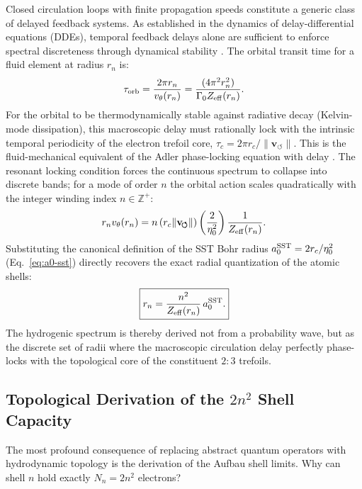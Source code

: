 \documentclass[11pt,a4paper]{article}
\begin{document}
Closed circulation loops with finite propagation speeds constitute a generic class of delayed feedback systems. As established in the dynamics of delay-differential equations (DDEs), temporal feedback delays alone are sufficient to enforce spectral discreteness through dynamical stability \cite{Erneux2009}. The orbital transit time for a fluid element at radius $r_n$ is:
\begin{equation}
\label{eq:OrbitalDelay}
\tau_{\rm orb} = \frac{2\pi r_n}{v_{\theta}(r_n)} = \frac{(4\pi^2 r_n^2)}{\Gamma_0 Z_{\rm eff}(r_n)}.
\end{equation}
For the orbital to be thermodynamically stable against radiative decay (Kelvin-mode dissipation), this macroscopic delay must rationally lock with the intrinsic temporal periodicity of the electron trefoil core, $\tau_c = 2\pi r_c / \lVert\mathbf{v}_{\!\boldsymbol{\circlearrowleft}}\rVert$. This is the fluid-mechanical equivalent of the Adler phase-locking equation with delay \cite{Adler1946}. The resonant locking condition forces the continuous spectrum to collapse into discrete bands; for a mode of order $n$ the orbital action scales quadratically with the integer winding index $n \in \mathbb{Z}^+$:
\begin{equation}
\label{eq:DelayLocking}
r_n v_{\theta}(r_n) = n \left( r_c \lVert\mathbf{v}_{\!\boldsymbol{\circlearrowleft}}\rVert \right) \left( \frac{2}{\eta_0^2} \right) \frac{1}{Z_{\rm eff}(r_n)}.
\end{equation}
Substituting the canonical definition of the SST Bohr radius $a_0^{\rm SST} = 2r_c / \eta_0^2$ (Eq.~\eqref{eq:a0-sst}) directly recovers the exact radial quantization of the atomic shells:
\begin{equation}
\label{eq:SST_OrbitRadii}
\boxed{
r_n = \frac{n^2}{Z_{\rm eff}(r_n)} \, a_0^{\rm SST}.
}
\end{equation}
The hydrogenic spectrum is thereby derived not from a probability wave, but as the discrete set of radii where the macroscopic circulation delay perfectly phase-locks with the topological core of the constituent $2{:}3$ trefoils.

\subsection{Topological Derivation of the $2n^2$ Shell Capacity}
The most profound consequence of replacing abstract quantum operators with hydrodynamic topology is the derivation of the Aufbau shell limits. Why can shell $n$ hold exactly $N_n = 2n^2$ electrons?
\end{document}
